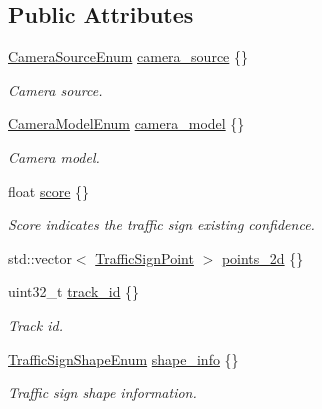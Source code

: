 \subsection*{Public Attributes}
\begin{DoxyCompactItemize}
\item 
\hyperlink{structmaf__perception__interface_1_1CameraSourceEnum}{Camera\+Source\+Enum} \hyperlink{structmaf__perception__interface_1_1TrafficSign_a0b32918e9aafff6c16f9da19e35a23a9}{camera\+\_\+source} \{\}
\begin{DoxyCompactList}\small\item\em Camera source. \end{DoxyCompactList}\item 
\hyperlink{structmaf__perception__interface_1_1CameraModelEnum}{Camera\+Model\+Enum} \hyperlink{structmaf__perception__interface_1_1TrafficSign_a90033eb7ae0b05888ab0fdebcd2c9c17}{camera\+\_\+model} \{\}
\begin{DoxyCompactList}\small\item\em Camera model. \end{DoxyCompactList}\item 
float \hyperlink{structmaf__perception__interface_1_1TrafficSign_a77fc9b556659b329e5d84c9a8d7d7213}{score} \{\}
\begin{DoxyCompactList}\small\item\em Score indicates the traffic sign existing confidence. \end{DoxyCompactList}\item 
std\+::vector$<$ \hyperlink{structmaf__perception__interface_1_1TrafficSignPoint}{Traffic\+Sign\+Point} $>$ \hyperlink{structmaf__perception__interface_1_1TrafficSign_a6c28c8d69d64a2199559159805c95129}{points\+\_\+2d} \{\}
\item 
uint32\+\_\+t \hyperlink{structmaf__perception__interface_1_1TrafficSign_aa76e1ceb5d970e0a035bbdc797cc37d8}{track\+\_\+id} \{\}
\begin{DoxyCompactList}\small\item\em Track id. \end{DoxyCompactList}\item 
\hyperlink{structmaf__perception__interface_1_1TrafficSignShapeEnum}{Traffic\+Sign\+Shape\+Enum} \hyperlink{structmaf__perception__interface_1_1TrafficSign_aaeb595a870312d476562d073d60a9ff0}{shape\+\_\+info} \{\}
\begin{DoxyCompactList}\small\item\em Traffic sign shape information. \end{DoxyCompactList}\item 

\end{DoxyCompactItemize}
